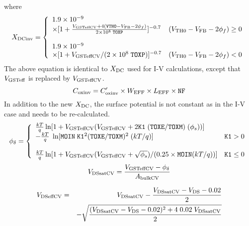\documentclass{article}
\begin{document}
where
\begin{equation}
X_{\rm{DCinv}} = \left\{\begin{array}{ll}
     1.9 \times 10^{-9} &  \nonumber\\
     \times [1 + {V_{\rm{GSTeffCV}} + 4(\texttt{VTH0} - V_{\rm{FB}} - 2\phi_f) \over 2 \times 10^8\;\texttt{TOXP}}]^{-0.7} & (V_{\rm{TH0}} - V_{\rm{FB}} - 2\phi_f) \geq 0 \nonumber \\
     & \\
     1.9 \times 10^{-9} & \nonumber \\
     \times [1 + V_{\rm{GSTeffCV}} / (2 \times 10^8\;\texttt{TOXP})]^{-0.7} & (V_{\rm{TH0}} - V_{\rm{FB}} - 2\phi_f) < 0
                            \end{array}
                    \right.
\end{equation}
The above equation is identical to $X_{\rm{DC}}$ used for I-V
calculations, except that $V_{\rm{GSTeff}}$ is replaced by
$V_{\rm{GSTeffCV}}$.
\begin{equation}
C_{\rm{oxinv}} = C^{\prime}_{\rm{oxinv}} \times W_{\rm{EFF}}
\times L_{\rm{EFF}} \times \texttt{NF}
\end{equation}
In addition to the new $X_{\rm{DC}}$, the surface potential is not
constant as in the I-V case and needs to be re-calculated.
\begin{equation}
\phi_{\delta} = \left\{\begin{array}{ll}
       \frac{k T}{q} \ln[{1 + V_{\rm{GSTeffCV}}(V_{\rm{GSTeffCV}} + 2\texttt{K1}\;(\texttt{TOXE} / \texttt{TOXM})\;(\phi_s))}] & \nonumber\\
       - \frac{k T}{q} \; \ln[\texttt{MOIN}\; \texttt{K1}^2 (\texttt{TOXE}/\texttt{TOXM})^2 \;(kT/q)] & \texttt{K1} > 0 \nonumber \\
       & \\
       {k T \over q} \ln[1 + V_{\rm{GSTeffCV}}(V_{\rm{GSTeffCV}} + \sqrt{\phi_s}) / (0.25 \times \texttt{MOIN} (k T /q))] & \texttt{K1} \leq 0 \\
                            \end{array}
                    \right.
\end{equation}
\begin{equation}
V_{\rm{DSsatCV}} = {V_{\rm{GSTeffCV}} - \phi_{\delta} \over
A_{\rm{bulkCV}}}
\end{equation}

\begin{eqnarray}
V_{\rm{DSeffCV}}& = & V_{\rm{DSsatCV}} - {V_{\rm{DSsatCV}} - V_{\rm{DS}} - 0.02 \over 2} \nonumber \\
            & & - \sqrt{(V_{\rm{DSsatCV}} - V_{\rm{DS}} - 0.02)^2 + 4\; 0.02\; V_{\rm{DSsatCV}}\over 2}
\end{eqnarray}
\end{document}
